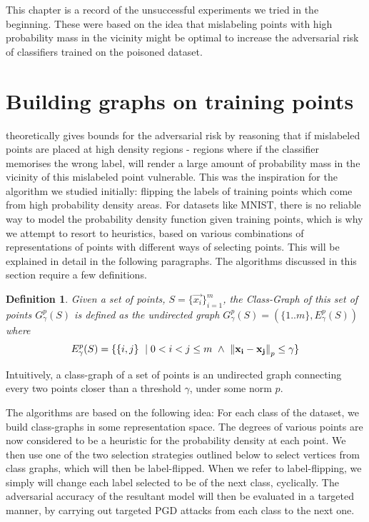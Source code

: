 \documentclass{ociamthesis}
\newtheorem{definition}{Definition}
\begin{document}
This chapter is a record of the unsuccessful experiments we tried in the
beginning. These were based on the idea that mislabeling points with high
probability mass in the vicinity might be optimal to increase the adversarial
risk of classifiers trained on the poisoned dataset.


\section{Building graphs on training points}

\citet{sanyal2021how} theoretically gives bounds for the adversarial risk by
reasoning that if mislabeled points are placed at high density regions - regions
where if the classifier memorises the wrong label, will render a large amount of
probability mass in the vicinity of this mislabeled point vulnerable. This was
the inspiration for the algorithm we studied initially: flipping the labels of
training points which come from high probability density areas. For datasets
like MNIST, there is no reliable way to model the probability density function
given training points, which is why we attempt to resort to heuristics, based on
various combinations of representations of points with different ways of
selecting points. This will be explained in detail in the following paragraphs.
The algorithms discussed in this section require a few definitions.

\begin{definition}
    Given a set of points, $S=\{\vec{x_i}\}_{i=1}^m$, the Class-Graph of this
    set of points $G_\gamma^{p}(S)$ is defined as the undirected graph
    $G_\gamma^{p}(S) = (\{1..m\}, E_\gamma^p(S))$ where
    \begin{equation*}
        E_\gamma^p(S) =
        \{\{i, j\}~\mid 0 < i < j \leq m~\wedge~
        \mathrm{\left\lVert{\mathbf{x_i}}-{\mathbf{x_j}}\right\rVert}_p \leq \gamma \}
    \end{equation*}
    \label{def:class-graph}
\end{definition}
Intuitively, a class-graph of a set of points is an undirected graph connecting
every two points closer than a threshold $\gamma$, under some norm $p$.

The algorithms are based on the following idea: For each class of the dataset,
we build class-graphs in some representation space. The degrees of various
points are now considered to be a heuristic for the probability density at each
point. We then use one of the two selection strategies outlined below to select
vertices from class graphs, which will then be label-flipped. When we refer to
label-flipping, we simply will change each label selected to be of the next
class, cyclically. The adversarial accuracy of the resultant model will then be
evaluated in a targeted manner, by carrying out targeted PGD attacks from each
class to the next one.
\end{document}
